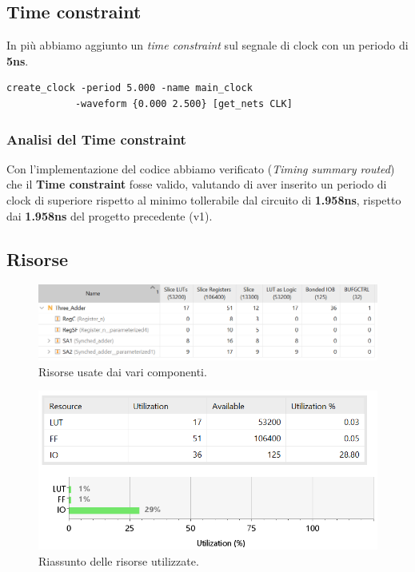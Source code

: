 \documentclass[12pt]{article}
\begin{document}
    \subsection{Time constraint}
        In più abbiamo aggiunto un \textit{time constraint} sul segnale di clock con un periodo di \textbf{5ns}.

        \begin{lstlisting}[basicstyle=\footnotesize]
            create_clock -period 5.000 -name main_clock
            -waveform {0.000 2.500} [get_nets CLK]
        \end{lstlisting}

        \subsubsection{Analisi del Time constraint}
            Con l'implementazione del codice abbiamo verificato (\textit{Timing summary routed}) che il \textbf{Time constraint} fosse valido, valutando di aver inserito un periodo di clock di superiore rispetto al minimo tollerabile dal circuito di \textbf{1.958ns}, rispetto dai \textbf{1.958ns} del progetto precedente (v1).

        \subsection{Risorse}
            \begin{figure}[ht]
                \centering
                \includegraphics[scale=0.8]{Risorse_1.png}
                \caption{Risorse usate dai vari componenti.}
            \end{figure}

            \begin{figure}[ht]
                \centering
                \includegraphics[scale=0.8]{Risorse_2.png}
                \caption{Riassunto delle risorse utilizzate.}
            \end{figure}
\end{document}
